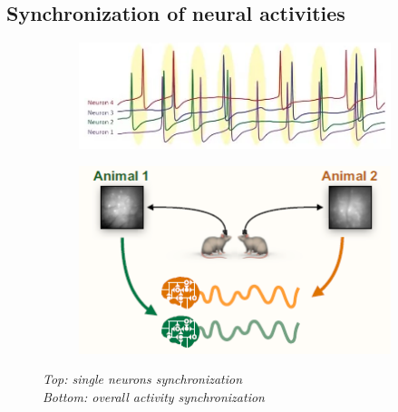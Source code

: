 \documentclass[a4paper]{article}
\begin{document}
\subsection{Synchronization of neural activities}

\begin{figure}[H]
	\begin{minipage}{\linewidth}
		\centering
		\begin{minipage}{0.6\linewidth}
			\begin{figure}[H]
				\includegraphics[width=\linewidth]{synch.png}
				
			\end{figure}
		\end{minipage}
		\hspace{0.05\linewidth}
		\begin{minipage}{0.6\linewidth}
			\begin{figure}[H]
				\includegraphics[width=\linewidth]{Intebrain.png}
				
			\end{figure}
		\end{minipage}
		
	\end{minipage}
\caption{\textit{Top: single neurons synchronization \\
		Bottom: overall activity synchronization}}
\end{figure}
\end{document}
